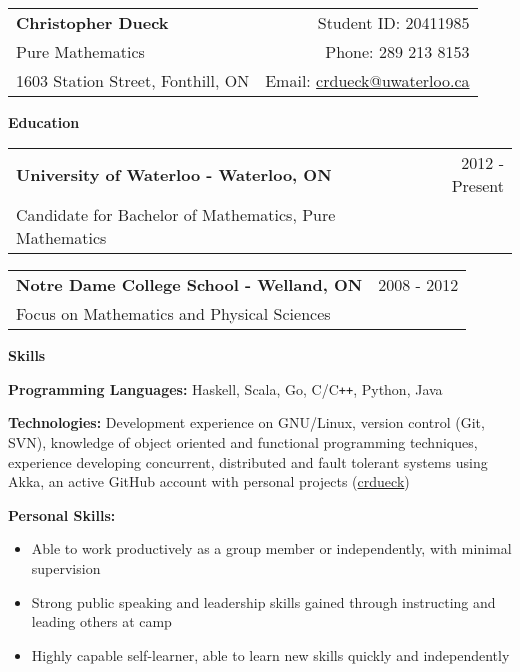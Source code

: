 \documentclass[10pt]{article}
\makeatletter
\newcommand{\resheader}[6]{\
\begin{tabular*}{7in}{l@{\extracolsep{\fill}}r}
    \textbf{\huge #1} & {\large #2} \vspace{4pt}\\
    {\large #3} & {\large #4} \vspace{4pt}\\
    {\large #5} & {\large #6}
\end{tabular*}\vspace{4pt}}
\newcommand{\resheading}[1]{{\large \colorbox{headercol}{\begin{minipage}{\textwidth}{\textbf{#1 \vphantom{p\^{E}}}}\end{minipage}}}}
\newcommand{\ressubheading}[3]{\item
\begin{tabular*}{7in}{l@{\extracolsep{\fill}}r}
    \textbf{#1} & #2 \\ #3
\end{tabular*}\vspace{-4pt}}
\newcommand{\resitem}[2]{\item{\textbf{#1} #2}}
\makeatother
\begin{document}
\resheader{Christopher Dueck} {Student ID: 20411985}
{Pure Mathematics} {Phone: 289 213 8153}
{1603 Station Street, Fonthill, ON} {Email: \href{mailto:crdueck@uwaterloo.ca}{crdueck@uwaterloo.ca}}

\resheading{Education}
\begin{description}
    \ressubheading{University of Waterloo - Waterloo, ON} {2012 - Present} {Candidate for Bachelor of Mathematics, Pure Mathematics}
    \ressubheading{Notre Dame College School - Welland, ON} {2008 - 2012} {Focus on Mathematics and Physical Sciences}
\end{description}

\resheading{Skills}
\begin{description}
    \resitem{Programming Languages:} {Haskell, Scala, Go, C/C\texttt{++}, Python, Java}
    \resitem{Technologies:} {Development experience on GNU/Linux, version control (Git, SVN), knowledge of object oriented and functional programming techniques, experience developing concurrent, distributed and fault tolerant systems using Akka, an active GitHub account with personal projects (\href{https://github.com/crdueck}{crdueck})}
    \resitem{Personal Skills:}{\vspace{-4pt}
    \begin{itemize}
        \item{Able to work productively as a group member or independently, with minimal supervision}
        \item{Strong public speaking and leadership skills gained through instructing and leading others at camp}
        \item{Highly capable self-learner, able to learn new skills quickly and independently}
    \end{itemize}}
\end{description}
\end{document}
